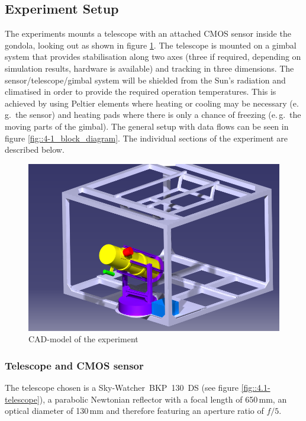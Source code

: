 \subsection{Experiment Setup} \label{Experiment_Setup}




The experiments mounts a telescope with an attached CMOS sensor inside the gondola, looking out as shown in figure \ref{fig::4-1_CAD}. The telescope is mounted on a gimbal system that provides stabilisation along two axes (three if required, depending on simulation results, hardware is available) and tracking in three dimensions. The sensor/telescope/gimbal system will be shielded from the Sun's radiation and climatised in order to provide the required operation temperatures. This is achieved by using Peltier elements where heating or cooling may be necessary (e.\,g.~the sensor) and heating pads where there is only a chance of freezing (e.\,g.~the moving parts of the gimbal). The general setup with data flows can be seen in figure \ref{fig::4-1_block_diagram}. The individual sections of the experiment are described below.

\begin{figure}[h]
	\centering
	\includegraphics[width=0.7\linewidth]{4-experiment-design/img/mechanical/Assembly_v3iso2}
	\caption{CAD-model of the experiment}
	\label{fig::4-1_CAD}
\end{figure}


\subsubsection{Telescope and CMOS sensor}
The telescope chosen is a Sky-Watcher~BKP~130~DS (see figure \ref{fig::4.1-telescope}), a parabolic Newtonian reflector with a focal length of 650\,mm, an optical diameter of 130\,mm and therefore featuring an aperture ratio of $f/5$. 

